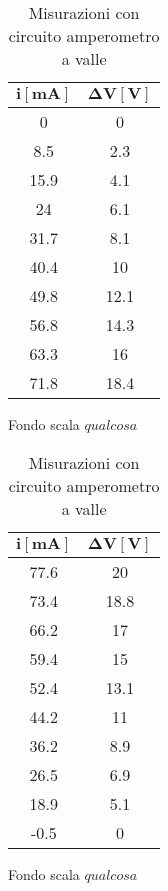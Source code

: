 \documentclass[12pt]{article}
\begin{document}
\begin{appendices}
\begin{table}[H]
  \begin{subtable}{.5\textwidth}
    \centering
    \begin{tabular}{|c|c|} \hline
     $\mathbf{i {[mA]}}$  & $\mathbf{\Delta V [V]}$  \\ \hline
      0 & 0  \\ \hline
      8.5 & 2.3  \\ \hline
      15.9 & 4.1  \\ \hline
      24 & 6.1  \\ \hline
      31.7 & 8.1  \\ \hline
      40.4 & 10  \\ \hline
      49.8 & 12.1  \\ \hline
      56.8 & 14.3  \\ \hline
      63.3 & 16  \\ \hline
      71.8 & 18.4  \\ \hline
    \end{tabular}
    \caption{Fondo scala $qualcosa$}
  \end{subtable}%
  \begin{subtable}{.5\textwidth}
  \centering
  \begin{tabular}{|c|c|} \hline
  $\mathbf{i {[mA]}}$  & $\mathbf{\Delta V [V]}$  \\ \hline
    77.6 & 20  \\ \hline
    73.4 & 18.8  \\ \hline
    66.2 & 17  \\ \hline
    59.4 & 15  \\ \hline
    52.4 & 13.1  \\ \hline
    44.2 & 11  \\ \hline
    36.2 & 8.9  \\ \hline
    26.5 & 6.9  \\ \hline
    18.9 & 5.1  \\ \hline
    -0.5 & 0  \\ \hline
  \end{tabular}
  \caption{Fondo scala $qualcosa$}
\end{subtable}
\caption{Misurazioni con circuito amperometro a valle}
\end{table}
\end{appendices}
\end{document}
